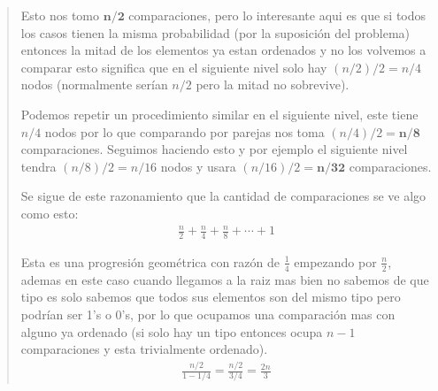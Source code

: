 \begin{quote}
    Esto nos tomo $\mathbf{n/2}$ comparaciones, pero lo interesante aqui es que si todos los casos tienen la misma probabilidad (por la suposición del problema) entonces la mitad de los elementos ya estan ordenados y no los volvemos a comparar esto significa que en el siguiente nivel solo hay $(n/2)/2=n/4$ nodos (normalmente serían $n/2$ pero la mitad no sobrevive). \vspace{.2cm}

    Podemos repetir un procedimiento similar en el siguiente nivel, este tiene $n/4$ nodos por lo que comparando por parejas nos toma $(n/4)/2 = \mathbf{n/8}$ comparaciones. Seguimos haciendo esto y por ejemplo el siguiente nivel tendra $(n/8)/2=n/16$ nodos y usara $(n/16)/2=\mathbf{n/32}$ comparaciones. \vspace{.2cm}  

    Se sigue de este razonamiento que la cantidad de comparaciones se ve algo como esto: 
    \begin{align*}
        \frac{n}{2} + \frac{n}{4} + \frac{n}{8} + \cdots + 1 
    \end{align*}

    Esta es una progresión geométrica con razón de $\frac{1}{4}$ empezando por $\frac{n}{2}$, ademas en este caso cuando llegamos a la raiz mas bien no sabemos de que tipo es solo sabemos que todos sus elementos son del mismo tipo pero podrían ser 1's o 0's, por lo que ocupamos una comparación mas con alguno ya ordenado (si solo hay un tipo entonces ocupa $n-1$ comparaciones y esta trivialmente ordenado).
    \begin{align*}
        \frac{n/2}{1-1/4} = \frac{n/2}{3/4} = \frac{2n}{3}
    \end{align*}


\end{quote}
